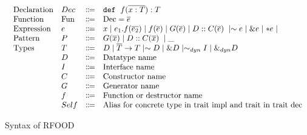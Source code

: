 \documentclass[ oneside,%
                    author={James Elgar},
                    degree={MEng},
                     title={Bidirectional transformer between functional and \\ object-oriented programming in Rust},
                  subtitle={}]{dissertation}
\begin{document}
\begin{figure}[t]
\begin{displaymath}
\begin{array}{l}
\begin{array}{llcl}
         \text{Declaration}
         & Dec & \Coloneqq & \dec {x: T} T\\
         \text{Function}
         & \text{Fun} & \text{$\Coloneqq$} & \text{Dec} = \overline{e} \\
        \text{Expression}
         & e & \Coloneqq & x %
          \mid e_1.f(\overline{e_2})  \mid f(\overline{e}) \mid \genn(\overline{e}) \mid \ctrCall{\dtn}{\ctrn}{e} \mid \sim e\mid \&e \mid *e \mid\\
         \text{Pattern}
         & P & \Coloneqq & \genn(\overline{x}) \mid \ctrCall{\dtn}{\ctrn}{x} \mid \_ \\
        \text{Types}
        & T & \Coloneqq & \dtn \mid \overline{T} \rightarrow T \mid \sim  \dtn \mid \& \dtn \mid \sim_{dyn} \itn \mid \&_{dyn} \dtn \\ %
        & \dtn & \Coloneqq & \text{Datatype name} \\
        & \itn & \Coloneqq & \text{Interface name} \\
        & \ctrn & \Coloneqq & \text{Constructor name} \\
        & \genn & \Coloneqq & \text{Generator name} \\
        & f & \Coloneqq & \text{Function or destructor name} \\
        & Self & \Coloneqq & \text{Alias for concrete type in trait impl and trait in trait dec} \\
        
      \end{array}
    \end{array}
  \end{displaymath}
  \caption{Syntax of RFOOD}
  \label{fig:syntax}
\end{figure}
\end{document}
